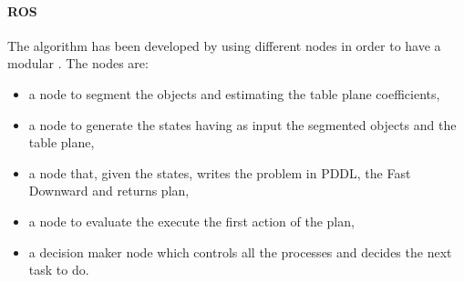 \paragraph{ROS}
The algorithm has been developed by using different nodes in order to have a modular . 
The nodes  are:
\begin{itemize}
\item a node to segment the objects and estimating the table plane coefficients,
\item a node to generate the states having as input the segmented objects and the table plane,
\item a node that, given the states, writes the problem in PDDL,  the Fast Downward  and returns  plan,
\item a node to evaluate the execute the first action of the plan,
\item a decision maker node which controls all the processes and decides the next task to do.  
\end{itemize}

